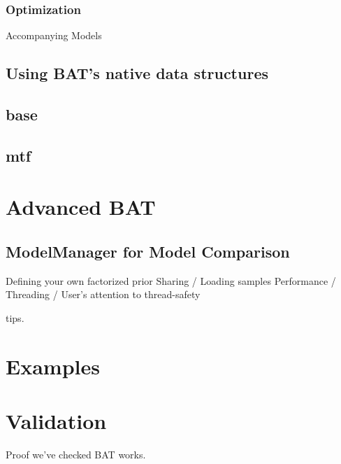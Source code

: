 \documentclass[11pt, a4paper]{article}
\newcommand{\dan}[1]{{\color{red}{Dan: #1}}}
\newcommand{\fred}[1]{{\color{blue}{Fred: #1}}}
\begin{document}
\subsubsection{Optimization}
\fred

\section{Accompanying Models}

\subsection{Using BAT's native data structures}

\subsection{base}

\subsection{mtf}


\section{Advanced BAT}

\subsection{ModelManager for Model Comparison}
\fred

\subsection{Defining your own factorized prior}
\dan

\subsection{Sharing / Loading samples}
\dan

\subsection{Performance / Threading / User's attention to thread-safety}

tips.

\section{Examples}

\section{Validation}

Proof we've checked BAT works.
\end{document}
